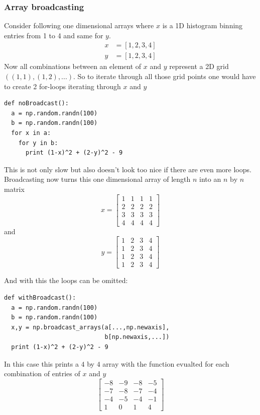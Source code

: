 \documentclass[11pt,twoside]{scrreprt}
\begin{document}
\subsubsection{Array broadcasting}
Consider following one dimensional arrays where $x$ is a 1D histogram binning entries from 1 to 4 and same for $y$. 
\begin{align*}
  x &= [1, 2, 3, 4]\\
  y &= [1, 2, 3, 4]  
\end{align*}
Now all combinations between an element of $x$ and $y$ represent a 2D grid $\left((1,1), (1,2), ...\right)$. So to iterate through all those grid points one would have to create 2 for-loops iterating through $x$ and $y$

\noindent\begin{minipage}{\linewidth}
\begin{lstlisting}
def noBroadcast():
  a = np.random.randn(100)
  b = np.random.randn(100) 
  for x in a:
    for y in b:
      print (1-x)^2 + (2-y)^2 - 9
\end{lstlisting}  
\end{minipage}
%
This is not only slow but also doesn't look too nice if there are even more loops.
Broadcasting now turns this one dimensional array of length $n$ into an $n\text{ by }n$ matrix
\[
  x = \begin{bmatrix}
  1 & 1 & 1 & 1 \\
  2 & 2 & 2 & 2 \\
  3 & 3 & 3 & 3\\
  4 & 4 & 4 & 4
  \end{bmatrix}
\]
and
\[
  y = \begin{bmatrix}
  1 & 2 & 3 & 4 \\
  1 & 2 & 3 & 4 \\
  1 & 2 & 3 & 4 \\
  1 & 2 & 3 & 4 
\end{bmatrix}
\]
\noindent\begin{minipage}{\linewidth}
And with this the loops can be omitted:
\begin{lstlisting}
def withBroadcast():
  a = np.random.randn(100)
  b = np.random.randn(100) 
  x,y = np.broadcast_arrays(a[...,np.newaxis],
                            b[np.newaxis,...])
  print (1-x)^2 + (2-y)^2 - 9
\end{lstlisting}  
\end{minipage}
In this case this prints a $4$ by $4$ array with the function evualted for each combination of entries of $x$ and $y$
\[
  \begin{bmatrix}
    -8& -9& -8& -5\\
    -7& -8& -7& -4\\
    -4& -5& -4& -1\\
     1&  0&  1&  4
       \end{bmatrix}
\]
\end{document}
